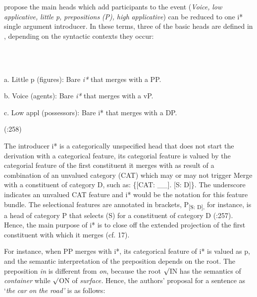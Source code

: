 \documentclass[output=paper,modfonts,nonflat]{langsci/langscibook}
\begin{document}
\citet{WoodMarantz2017} propose the main heads which add participants to the event (\textit{Voice,} \textit{low} \textit{applicative,} \textit{little} \textit{p,} \textit{prepositions} \textit{(P),} \textit{high} \textit{applicative}) can be reduced to one i* single argument introducer. In these terms, three of the basic heads are defined in , depending on the syntactic contexts they occur:

\ea%
    \label{ex:key:16}
    \gll\\
        \\
    \glt
    \z

          a. Little p (figures): Bare \textit{i*} that merges with a PP.

  b. Voice (agents): Bare \textit{i*} that merges with a vP.

  c. Low appl (possessors): Bare i* that merges with a DP.

                                                                  (\citealt{WoodMarantz2017}:258)

  The introducer i* is a categorically unspecified head that does not start the derivation with a categorical feature, its categorial feature is valued by the categorial feature of the first constituent it merges with as result of a combination of an unvalued category (CAT) which may or may not trigger Merge with a constituent of category D, such as: \{[CAT: \_\_]. [S: D]\}. The underscore indicates an unvalued CAT feature and i* would be the notation for this feature bundle. The selectional features are annotated in brackets, P\textsubscript{[S: D],} for instance,\textsubscript{}  is a head of category P that selects (S) for a constituent of category D (\citealt{WoodMarantz2017}:257). Hence, the main purpose of i* is to close off the extended projection of the first constituent with which it merges (cf. 17). 

For instance, when PP merges with i*, its categorical feature of i* is valued as p, and the semantic interpretation of the preposition depends on the root. The preposition \textit{in} is different from \textit{on}, because the root ${\surd}$IN has the semantics of \textit{container} while ${\surd}$ON of \textit{surface.} Hence, the authors’ proposal for a sentence as ‘\textit{the} \textit{car} \textit{on} \textit{the} \textit{road’} is as follows:

  

 
\end{document}
